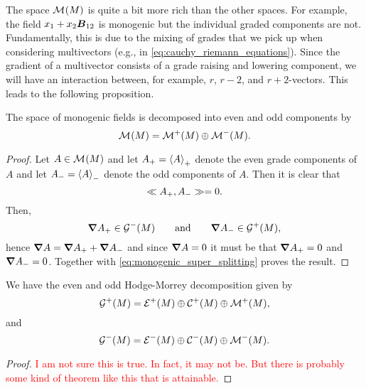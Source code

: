 The space $\monogenicfields{}$ is quite a bit more rich than the other spaces.  For example, the field $x_1+x_2 \blade{B}_{12}$ is monogenic but the individual graded components are not. Fundamentally, this is due to the mixing of grades that we pick up when considering multivectors (e.g., in \cref{eq:cauchy_riemann_equations}). Since the gradient of a multivector consists of a grade raising and lowering component, we will have an interaction between, for example, $r$, $r-2$, and $r+2$-vectors. This leads to the following proposition.

\begin{lemma}
The space of monogenic fields is decomposed into even and odd components by
\begin{equation}
    \monogenicfields{} = \monogenicfields{+} \oplus \monogenicfields{-}.
\end{equation}
\end{lemma}
\begin{proof}
Let $A \in \monogenicfields{}$ and let $A_+=\proj{+}{A}$ denote the even grade components of $A$ and let $A_-=\proj{-}{A}$ denote the odd components of $A$. Then it is clear that 
\begin{equation}
\label{eq:monogenic_super_splitting}
\multivecinnerproduct{A_+}{A_-} = 0.
\end{equation}
Then,
\begin{equation}
\grad A_+ \in \G^-(M) \qquad \textrm{and} \qquad \grad A_- \in \G^+(M),
\end{equation}
hence $\grad A = \grad A_+ + \grad A_-$ and since $\grad A=0$ it must be that $\grad A_+=0$ and $\grad A_-=0$. Together with \cref{eq:monogenic_super_splitting} proves the result.
\end{proof}

\begin{theorem}
We have the even and odd Hodge-Morrey decomposition given by
\begin{equation}
\G^+(M) = \exactfields{+} \oplus \coexactfields{+} \oplus \monogenicfields{+},
\end{equation}
and
\begin{equation}
\G^-(M) = \exactfields{-} \oplus \coexactfields{-} \oplus \monogenicfields{-}.
\end{equation}
\end{theorem}
\begin{proof}
\textcolor{red}{I am not sure this is true. In fact, it may not be. But there is probably some kind of theorem like this that is attainable.}
\end{proof}

